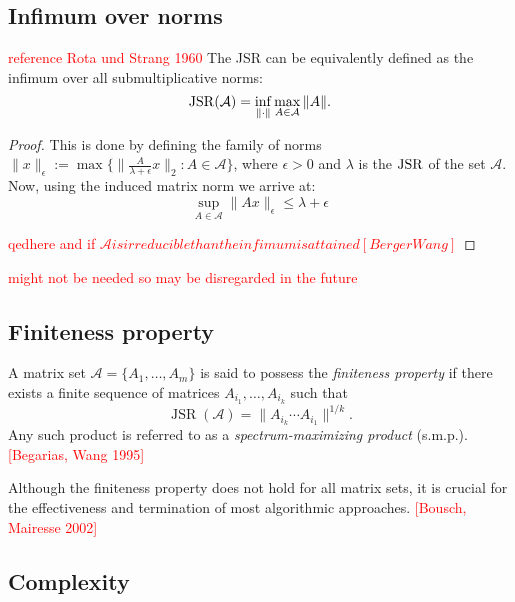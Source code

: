 \subsection*{Infimum over norms}
\begin{proposition}
    \textcolor{red}{reference Rota und Strang 1960}
    The JSR can be equivalently defined as the infimum over all submultiplicative norms:
    \begin{equation}
        \operatorname{JSR}(\mathcal{A}) = \inf_{\|\cdot\|} \max_{A \in \mathcal{A}} \|A\|.
    \end{equation}
\end{proposition}

\begin{proof}
    This is done by defining the family of norms $\|x\|_{\epsilon} := \max \{ \| \frac{A}{\lambda + \epsilon}x\|_2 : A \in \mathcal{A}\}$,
    where $\epsilon > 0$ and $\lambda$ is the $\operatorname{JSR}$ of the set $\mathcal{A}$.
    Now, using the induced matrix norm we arrive at: 
    $$ \sup _{A \in \mathcal{A}} \|Ax\|_{\epsilon} \leq \lambda + \epsilon$$

\textcolor{red}{qedhere and if $\mathcal{A} is irreducible than the infimum is attained [BergerWang]$}

\end{proof}

\textcolor{red}{might not be needed so may be disregarded in the future}

\subsection*{Finiteness property}
\begin{definition}
    A matrix set $\mathcal{A} = \{ A_1, \dots, A_m \}$ is said to possess the \emph{finiteness property} if there exists a finite sequence of matrices $A_{i_1}, \dots, A_{i_k}$ such that
    \begin{equation}
        \operatorname{JSR}(\mathcal{A}) = \|A_{i_k} \cdots A_{i_1}\|^{1/k}.
    \end{equation}
    Any such product is referred to as a \emph{spectrum-maximizing product} (s.m.p.).
    \textcolor{red}{[Begarias, Wang 1995]}
\end{definition}
Although the finiteness property does not hold for all matrix sets, it is crucial for the effectiveness and termination of most algorithmic approaches.
\textcolor{red}{[Bousch, Mairesse 2002]}

\subsection*{Complexity}


